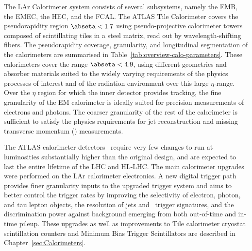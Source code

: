\documentclass[cernpreprint, atlasdraft=false, UKenglish,british,orcidlogo, texmf, orcidlogo]{atlasdoc}
\begin{document}
The \gls{LAr} Calorimeter system consists of several subsystems, namely the
\gls{EMB}, the \gls{EMEC}, the \gls{HEC},
and the \gls{FCAL}. The ATLAS Tile Calorimeter covers the pseudorapidity region $\abseta<1.7$ using pseudo-projective calorimeter towers composed of scintillating tiles in a steel matrix, read out by wavelength-shifting fibers. The pseudorapidity coverage, granularity, and longitudinal
segmentation of the calorimeters are summarised in Table~\ref{tab:overview-calo-parameters}.
These calorimeters cover the range  $\abseta<4.9$, using different
geometries and absorber materials suited to the widely varying requirements of the physics processes of interest
and of the radiation environment over this large $\eta$-range.
Over the $\eta$ region for which the inner detector provides tracking, the fine granularity of
the \gls{EM} calorimeter is ideally suited for precision measurements of electrons and photons.
The coarser granularity of the rest of the calorimeter is sufficient to satisfy the
physics requirements for jet reconstruction and missing transverse momentum (\MET) measurements.
 
The ATLAS calorimeter detectors~\cite{LARG-2009-01} require very few changes to run at luminosities substantially higher than the original design, and are expected to last the entire lifetime of the \gls{LHC} and \gls{HL-LHC}. The main calorimeter upgrades were performed on the \gls{LAr} calorimeter electronics. A new digital trigger path provides finer granularity inputs to the upgraded trigger system and aims to better control the trigger rates by improving the selectivity of electron, photon, and tau lepton objects, the resolution of jets and \MET\ trigger signatures, and the discrimination power against background emerging from both out-of-time and in-time pileup. These upgrades as well as improvements to Tile calorimeter cryostat scintillation counters and Minimum Bias Trigger Scintillators are described in Chapter~\ref{sec:Calorimeters}.
 
\end{document}
